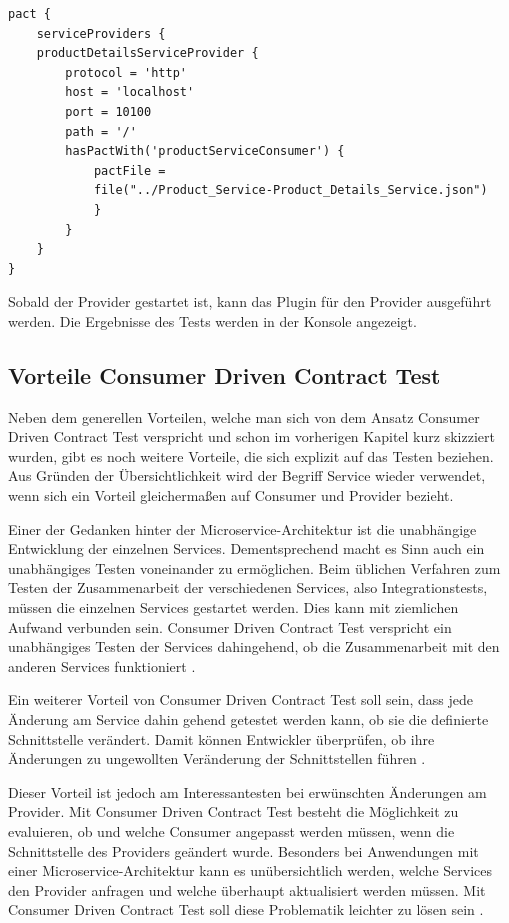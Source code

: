 \documentclass{llncs}
\begin{document}
\lstset{language = Java}
\begin{lstlisting}[caption=Einstellungen für das Testen vom Provider,label=lst:pluginProvider]
pact {
    serviceProviders {
    productDetailsServiceProvider {
        protocol = 'http'
        host = 'localhost'
        port = 10100
        path = '/'
        hasPactWith('productServiceConsumer') {
            pactFile = 
            file("../Product_Service-Product_Details_Service.json")
            }
        }
    }
}
\end{lstlisting}

Sobald der Provider gestartet ist, kann das Plugin für den Provider ausgeführt werden. Die Ergebnisse des Tests werden in der Konsole angezeigt.
\subsection{Vorteile Consumer Driven Contract Test}
Neben dem generellen Vorteilen, welche man sich von dem Ansatz Consumer Driven Contract Test verspricht und schon im vorherigen Kapitel kurz skizziert wurden, gibt es noch weitere Vorteile, die sich explizit auf das Testen beziehen. Aus Gründen der Übersichtlichkeit wird der Begriff Service wieder verwendet, wenn sich ein Vorteil gleichermaßen auf Consumer und Provider bezieht.

Einer der Gedanken hinter der Microservice-Architektur ist die unabhängige Entwicklung der einzelnen Services. Dementsprechend macht es Sinn auch ein unabhängiges Testen voneinander zu ermöglichen. Beim üblichen Verfahren zum Testen der Zusammenarbeit der verschiedenen Services, also Integrationstests, müssen die einzelnen Services gestartet werden. Dies kann mit ziemlichen Aufwand verbunden sein. Consumer Driven Contract Test verspricht ein unabhängiges Testen der Services dahingehend, ob die Zusammenarbeit mit den anderen Services funktioniert \cite{Vincent2015, bayer2015jaxcenter}. 

Ein weiterer Vorteil von Consumer Driven Contract Test soll sein, dass jede Änderung am Service dahin gehend getestet werden kann, ob sie die definierte Schnittstelle verändert. Damit können Entwickler überprüfen, ob ihre Änderungen zu ungewollten Veränderung der Schnittstellen führen \cite{bayer2015jaxcenter}.

Dieser Vorteil ist jedoch am Interessantesten bei erwünschten Änderungen am Provider. Mit Consumer Driven Contract Test besteht die Möglichkeit zu evaluieren, ob und welche Consumer angepasst werden müssen, wenn die Schnittstelle des Providers geändert wurde. Besonders bei Anwendungen mit einer Microservice-Architektur kann es unübersichtlich werden, welche Services den Provider anfragen und welche überhaupt aktualisiert werden müssen. Mit Consumer Driven Contract Test soll diese Problematik leichter zu lösen sein \cite{vitz2016inno, Vincent2015}.
\end{document}
